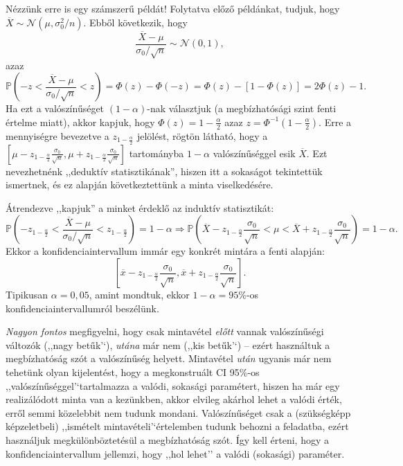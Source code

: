 \documentclass[]{book}
\begin{document}
Nézzünk erre is egy számszerű példát! Folytatva előző példánkat, tudjuk,
hogy \(\overline{X} \sim \mathcal{N}\left(\mu,\sigma_0^2/n\right)\).
Ebből következik, hogy \[
    \frac{\overline{X}-\mu}{\sigma_0/\sqrt{n}}\sim\mathcal{N}\left(0,1\right),
\] azaz \[
    \mathbb{P}\left(-z<\frac{\overline{X}-\mu}{\sigma_0/\sqrt{n}}<z\right)=\Phi\left(z\right)-\Phi\left(-z\right)=\Phi\left(z\right)-\left[1-\Phi\left(z\right)\right]=2\Phi\left(z\right)-1.
\] Ha ezt a valószínűséget \(\left(1-\alpha\right)\)-nak választjuk (a
megbízhatósági szint fenti értelme miatt), akkor kapjuk, hogy
\(\Phi\left(z\right)=1-\frac{\alpha}{2}\) azaz
\(z=\Phi^{-1}\left(1-\frac{\alpha}{2}\right)\). Erre a mennyiségre
bevezetve a \(z_{1-\frac{\alpha}{2}}\) jelölést, rögtön látható, hogy a
\(\left[\mu-z_{1-\frac{\alpha}{2}}\frac{\sigma_0}{\sqrt{n}},\mu+z_{1-\frac{\alpha}{2}}\frac{\sigma_0}{\sqrt{n}}\right]\)
tartományba \(1-\alpha\) valószínűséggel esik \(\overline{X}\). Ezt
nevezhetnénk ,,deduktív statisztikának'', hiszen itt a sokaságot
tekintettük ismertnek, és ez alapján következtettünk a minta
viselkedésére.

Átrendezve ,,kapjuk'' a minket érdeklő az induktív statisztikát: \[
    \mathbb{P}\left(-z_{1-\frac{\alpha}{2}}<\frac{\overline{X}-\mu}{\sigma_0/\sqrt{n}}<z_{1-\frac{\alpha}{2}}\right)=1-\alpha \Rightarrow \mathbb{P}\left(\overline{X}-z_{1-\frac{\alpha}{2}}\frac{\sigma_0}{\sqrt{n}}<\mu<\overline{X}+z_{1-\frac{\alpha}{2}}\frac{\sigma_0}{\sqrt{n}}\right)=1-\alpha.
\] Ekkor a konfidenciaintervallum immár egy konkrét mintára a fenti
alapján: \[
    \left[\overline{x}-z_{1-\frac{\alpha}{2}}\frac{\sigma_0}{\sqrt{n}},\overline{x}+z_{1-\frac{\alpha}{2}}\frac{\sigma_0}{\sqrt{n}}\right].
\] Tipikusan \(\alpha=0,\!05\), amint mondtuk, ekkor
\(1-\alpha=95\)\%-os konfidenciaintervallumról beszélünk.

\emph{Nagyon fontos} megfigyelni, hogy csak mintavétel \emph{előtt}
vannak valószínűségi változók (,,nagy betűk'`), \emph{utána} már nem
(,,kis betűk'`) -- ezért használtuk a megbízhatóság szót a valószínűség
helyett. Mintavétel \emph{után} ugyanis már nem tehetünk olyan
kijelentést, hogy a megkonstruált CI 95\%-os
,,valószínűséggel'`tartalmazza a valódi, sokasági paramétert, hiszen ha
már egy realizálódott minta van a kezünkben, akkor elvileg akárhol lehet
a valódi érték, erről semmi közelebbit nem tudunk mondani.
Valószínűséget csak a (szükségképp képzeletbeli) ,,ismételt
mintavételi'`értelemben tudunk behozni a feladatba, ezért használjuk
megkülönböztetésül a megbízhatóság szót. Így kell érteni, hogy a
konfidenciaintervallum jellemzi, hogy ,,hol lehet'' a valódi (sokasági)
paraméter.
\end{document}
